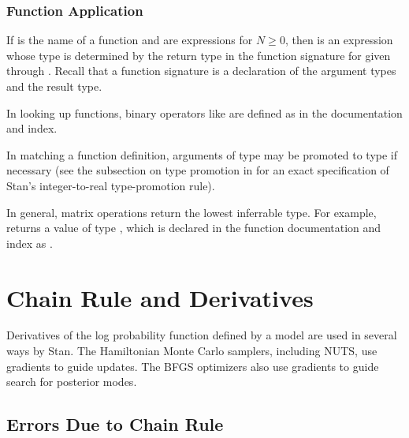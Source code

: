 \subsubsection{Function Application}

If  is the name of a function and  are
expressions for $N \geq 0$, then  is an expression
whose type is determined by the return type in the function signature
for  given  through .  Recall that a
function signature is a declaration of the argument types and the
result type.

In looking up functions, binary operators like  are
defined as  in the documentation and index.

In matching a function definition, arguments of type  may be
promoted to type  if necessary (see the subsection on type
promotion in  for an exact
specification of Stan's integer-to-real type-promotion rule).

In general, matrix operations return the lowest inferrable type.  For
example,  returns a value of type
, which is declared in the function documentation and index
as .



\section{Chain Rule and Derivatives}

Derivatives of the log probability function defined by a model are
used in several ways by Stan.  The Hamiltonian Monte Carlo samplers,
including NUTS, use gradients to guide updates.  The BFGS optimizers
also use gradients to guide search for posterior modes.

\subsection{Errors Due to Chain Rule}

